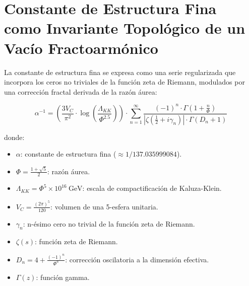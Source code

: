 \documentclass{article} %
\begin{document}
\section*{Constante de Estructura Fina como Invariante Topológico de un Vacío Fractoarmónico}

La constante de estructura fina se expresa como una serie regularizada que incorpora los ceros no triviales de la función zeta de Riemann, modulados por una corrección fractal derivada de la razón áurea:

\begin{equation}
\alpha^{-1} = \left( \frac{3 V_C}{\pi^2} \cdot \log\left( \frac{\Lambda_{KK}}{\Phi^{2.5}} \right) \right) \cdot 
\sum_{n=1}^{\infty} \frac{(-1)^n \cdot \Gamma\left(1 + \frac{n}{\Phi} \right)}
{ \left| \zeta\left( \tfrac{1}{2} + i \gamma_n \right) \right| \cdot \Gamma\left( D_n + 1 \right) }
\label{eq:alpha-topo}
\end{equation}

\noindent
donde:

\begin{itemize}
  \item \( \alpha \): constante de estructura fina (\( \approx 1/137.035999084 \)).
  \item \( \Phi = \frac{1 + \sqrt{5}}{2} \): razón áurea.
  \item \( \Lambda_{KK} = \Phi^5 \times 10^{16} \ \mathrm{GeV} \): escala de compactificación de Kaluza-Klein.
  \item \( V_C = \frac{(2\pi)^5}{120} \): volumen de una 5-esfera unitaria.
  \item \( \gamma_n \): n-ésimo cero no trivial de la función zeta de Riemann.
  \item \( \zeta(s) \): función zeta de Riemann.
  \item \( D_n = 4 + \frac{(-1)^n}{\Phi^n} \): corrección oscilatoria a la dimensión efectiva.
  \item \( \Gamma(z) \): función gamma.
\end{itemize}
\end{document}
